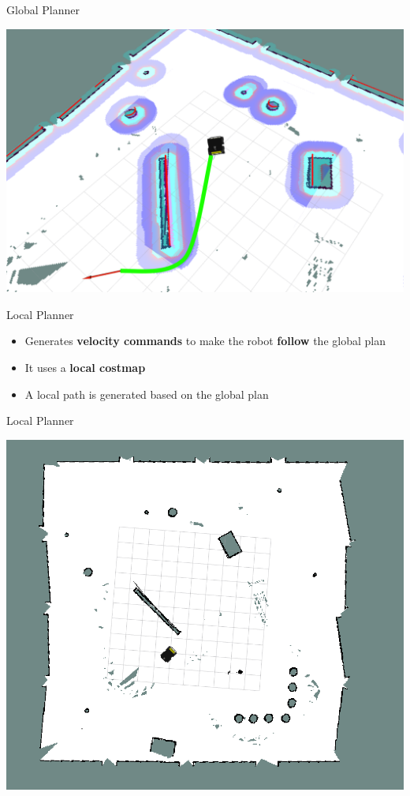 \documentclass{beamer}
\begin{document}
\begin{frame}{Global Planner}
	\subtitle{Navigation Stack} 
	\centering
	\includegraphics[width=.99\linewidth]{figures/costmap_6.png}
\end{frame}

\begin{frame}{Local Planner}
	\subtitle{Navigation Stack} 
	\begin{itemize}
	\item Generates \textbf{velocity commands} to make the robot \textbf{follow} the global plan
	\vspace{0.5cm}
	\item It uses a \textbf{local costmap}
	\vspace{0.5cm}
	\item A local path is generated based on the global plan
	\vspace{0.5cm}		
\end{itemize}
\end{frame}

\begin{frame}{Local Planner}
	\subtitle{Navigation Stack} 
	\centering
	\includegraphics[width=.7\linewidth]{figures/costmap_0.png}
\end{frame}
\end{document}
